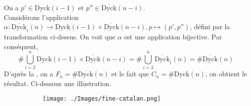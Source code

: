 On a $p'\in \text{Dyck}(i-1) $ et  $p'' \in \overline{\text{Dyck}}(n-i)$. \\
Considérons l'application $\alpha: \overline{\text{Dyck}}_{i}(n) \longrightarrow \text{Dyck}(i-1) \times \overline{\text{Dyck}}(n-i), p \mapsto (p', p'')$, défini par la transformation ci-dessus. On voit que $\alpha$ est une application bijective.\newpage
Par conséquent,
$$\#\underset{i=2}{\overset{n}{\bigcup}}\text{Dyck}(i-1) \times \overline{\text{Dyck}}(n-i)= \# \underset{i=2}{\overset{n}{\bigcup}}\overline{\text{Dyck}}_{i}(n) = \# \overline{\text{Dyck}}(n)$$
D'après la , on a $F_{n} = \#\overline{\text{Dyck}}(n)$ et le fait que $C_{n}=\#\text{Dyck}(n)$, on obtient le résultat.
Ci-dessous une illustration.
\begin{figure}[h!]
	\begin{subfigure}[b]{0.38\textwidth}
		\centering
		\texttt{[image: ./Images/fine-catalan.png]}
	\end{subfigure}
\end{figure}
























